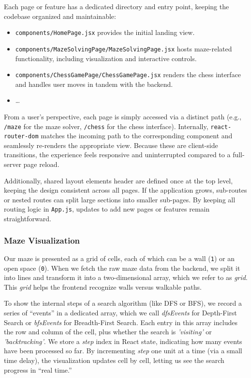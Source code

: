 \documentclass[12pt,a4paper]{article}
\begin{document}
Each page or feature has a dedicated directory and entry point, keeping the 
codebase organized and maintainable:
\begin{itemize}
  \item \texttt{components/HomePage.jsx} provides the initial landing view.
  \item \texttt{components/MazeSolvingPage/MazeSolvingPage.jsx} hosts maze-related 
        functionality, including visualization and interactive controls.
  \item \texttt{components/ChessGamePage/ChessGamePage.jsx} renders the chess 
        interface and handles user moves in tandem with the backend.
  \item \ldots
\end{itemize}

From a user’s perspective, each page is simply accessed via a distinct path 
(e.g., \texttt{/maze} for the maze solver, \texttt{/chess} for the chess 
interface). Internally, \texttt{react-router-dom} matches the incoming path 
to the corresponding component and seamlessly re-renders the appropriate 
view. Because these are client-side transitions, the experience feels 
responsive and uninterrupted compared to a full-server page reload.

Additionally, shared layout elements header are defined once at the top level, keeping the design consistent across all pages. If the application grows, sub-routes or nested routes can split large sections into smaller sub-pages. By keeping all routing logic in \texttt{App.js}, updates to add new pages or features remain straightforward.

    \subsubsection{Maze Visualization}

Our maze is presented as a grid of cells, each of which can be a wall 
(\texttt{1}) or an open space (\texttt{0}). When we fetch the raw maze data 
from the backend, we split it into lines and transform it into a 
two-dimensional array, which we refer to as \emph{grid}. This \emph{grid} 
helps the frontend recognize walls versus walkable paths.

To show the internal steps of a search algorithm (like DFS or BFS), we record 
a series of “events” in a dedicated array, which we call \emph{dfsEvents} 
for Depth-First Search or \emph{bfsEvents} for Breadth-First Search. Each 
entry in this array includes the row and column of the cell, plus whether 
the search is \emph{'visiting'} or \emph{'backtracking'}. We store a 
\emph{step} index in React state, indicating how many events have been 
processed so far. By incrementing \emph{step} one unit at a time (via a 
small time delay), the visualization updates cell by cell, letting us see 
the search progress in “real time.”
\end{document}
